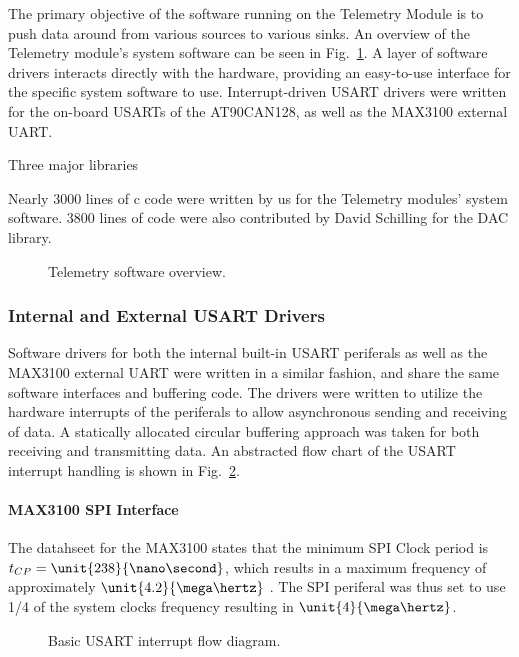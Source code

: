 The primary objective of the software running on the Telemetry Module is to push data around from various sources to various sinks. An overview of the Telemetry module's system software can be seen in Fig.\ \ref{fig:telemetry_software_implementation}. A layer of software drivers interacts directly with the hardware, providing an easy-to-use interface for the specific system software to use. Interrupt-driven USART drivers were written for the on-board USARTs of the AT90CAN128, as well as the MAX3100 external UART.

Three major libraries 

Nearly 3000 lines of c code were written by us for the Telemetry modules' system software. 3800 lines of code were also contributed by David Schilling for the DAC library.

\begin{figure}[H]
\centering

\caption{Telemetry software overview.}
\label{fig:telemetry_software_implementation}
\end{figure}

\subsubsection{Internal and External USART Drivers}

Software drivers for both the internal built-in USART periferals as well as the MAX3100 external UART were written in a similar fashion, and share the same software interfaces and buffering code. The drivers were written to utilize the hardware interrupts of the periferals to allow asynchronous sending and receiving of data. A statically allocated circular buffering approach was taken for both receiving and transmitting data. An abstracted flow chart of the USART interrupt handling is shown in Fig.\ \ref{fig:usart_driver_flow}.

\paragraph{MAX3100 SPI Interface}

The datahseet for the MAX3100 states that the minimum SPI Clock period is $t_{CP}=\unit{238}{\nano\second}$, which results in a maximum frequency of approximately $\unit{4.2}{\mega\hertz}$ \cite{MAX3100}. The SPI periferal was thus set to use 1/4 of the system clocks frequency resulting in $\unit{4}{\mega\hertz}$.

\begin{figure}[H]
\centering

\caption{Basic USART interrupt flow diagram.}
\label{fig:usart_driver_flow}
\end{figure}

